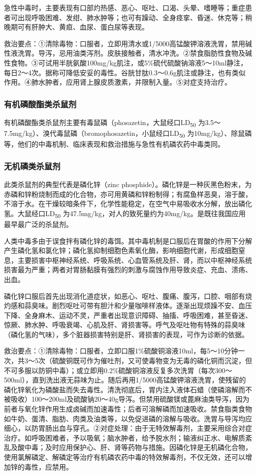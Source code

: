 急性中毒时，主要表现有口部灼热感、恶心、呕吐、口渴、头晕、嗜睡等；重症患者可出现呼吸困难、发绀、肺水肿等；也可有躁动、全身痉挛、昏迷、休克等；稍晚期可有肝肿大、黄疸、血尿、蛋白尿等表现。

救治要点：①清除毒物：口服者，立即用清水或1/5000高锰酸钾溶液洗胃，禁用碱性液洗胃。导泻，忌用油类泻剂。皮肤接触者，清水冲洗。②禁食脂肪性食物及碱性食物。③可试用半胱氨酸100mg/kg肌注，或5\%硫代硫酸钠溶液5～10ml静注，每日2～4次。据称可降低安妥的毒性。谷胱甘肽0.3～0.6g肌注或静注，也有类似作用。④肺水肿者，应用肾上腺皮质激素，并限制入量。⑤对症支持治疗。

\subsubsection{有机磷酸酯类杀鼠剂}

有机磷酸酯类杀鼠剂主要有毒鼠磷（phosazetin，大鼠经口LD\textsubscript{50}
为3.5～7.5mg/kg）、溴代毒鼠磷（bromophosazetin，小鼠经口LD\textsubscript{50}
为10mg/kg）、除鼠磷等，他们的中毒机制、临床表现和救治措施与急性有机磷农药中毒类同。

\subsubsection{无机磷类杀鼠剂}

此类杀鼠剂的典型代表是磷化锌（zinc
phosphide）。磷化锌是一种灰黑色粉末，为赤磷和锌粉烧制而成的化合物，亦可用黄磷和锌粉制得；有腐鱼样恶臭，溶于酸，不溶于水。在干燥较暗条件下，化学性能稳定，在空气中易吸收水分解，放出磷化氢。大鼠经口LD\textsubscript{50}
为47.5mg/kg，对人的致死量约为40mg/kg。是既往我国应用最早最广泛的杀鼠剂。

人类中毒多由于误食拌有磷化锌的毒饵。其中毒机制是口服后在胃酸的作用下分解产生磷化氢和氯化锌；磷化氢抑制细胞色素氧化酶，影响细胞代谢，形成细胞窒息，主要损害中枢神经系统、呼吸系统、心血管系统及肝、肾，而以中枢神经系统损害最为严重；两者对胃肠黏膜有强烈的刺激与腐蚀作用导致炎症、充血、溃疡、出血。

磷化锌口服后首先出现消化道症状，如恶心、呕吐、腹痛、腹泻，口腔、咽部有烧灼感和蒜臭味。剧烈呕吐可带有胆汁和少量咖啡样液体。逐渐出现烦躁不安、血压下降、全身麻木、运动不灵，严重者出现意识障碍、抽搐、呼吸困难，甚至昏迷、惊厥、肺水肿、呼吸衰竭、心肌及肝、肾损害等。呼气及呕吐物有特殊的蒜臭味（磷化氢的气味），多个脏器损害特别是肝、肾损害的表现，可作为诊断的依据。

救治要点：①清除毒物：口服者，立即口服1\%硫酸铜溶液10ml，每5～10分钟一次，共3～5次（硫酸铜既可作为催吐剂，又可使毒物变为无毒的磷化铜而沉淀，但不可多服以防铜中毒）；或立即用0.2\%硫酸铜溶液反复多次洗胃（每次300～500ml），直到洗出液无蒜味为止。随后再用1/5000高锰酸钾溶液洗胃，使残留的磷化锌氧化为磷酸盐而失去毒性。清洗彻底后，胃内注入液体石蜡（使磷溶解而不被吸收）100～200ml及硫酸钠20～40g导泻。但禁用硫酸镁或蓖麻油类导泻，因为前者与氧化锌作用生成卤碱而加速毒性；后者可溶解磷而加速吸收。禁食脂类食物如牛奶、蛋清、脂肪、肉类及油类等，以免促进磷的溶解与吸收。洗胃与导泻均应细心，以防胃肠出血与穿孔。②对症处理：由于无特效解毒剂，主要采用综合对症治疗。如呼吸困难者，予以吸氧；脑水肿者，给予脱水剂；输液纠正水、电解质紊乱及酸中毒；及时应用保护心、肝、肾等药物与措施。因磷化锌是无机磷化合物，使用氯解磷定、解磷定等治疗有机磷农药中毒的特效解毒剂，不仅无效，还可以增加锌的毒性，应禁用。

